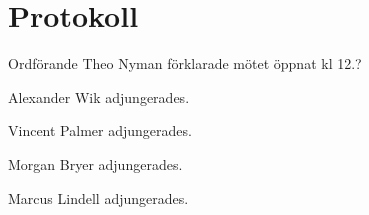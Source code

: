 \documentclass[10pt]{article}
\def\mo{Theo Nyman}
\begin{document}
\section*{Protokoll}
\begin{paragrafer}
Ordförande {\mo} förklarade mötet öppnat kl 12.?

{\valavmo}

{\valavms}

{\valavj}

{\tosg}












Alexander Wik adjungerades.

Vincent Palmer adjungerades.

Morgan Bryer adjungerades.

Marcus Lindell adjungerades.







\end{paragrafer}
\end{document}
